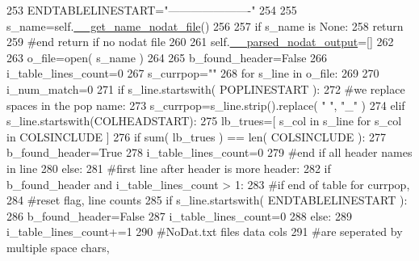 \begin{DoxyCode}
253         ENDTABLELINESTART=\textcolor{stringliteral}{"----------------------"}  
254 
255         s\_name=self.\hyperlink{classnegui_1_1pgoutputneestimator_1_1PGOutputNeEstimator_ab1fea13d322982ecc8b5fbe42741de50}{\_\_get\_name\_nodat\_file}()
256 
257         \textcolor{keywordflow}{if} s\_name \textcolor{keywordflow}{is} \textcolor{keywordtype}{None}:
258             \textcolor{keywordflow}{return}
259         \textcolor{comment}{#end return if no nodat file}
260 
261         self.\hyperlink{classnegui_1_1pgoutputneestimator_1_1PGOutputNeEstimator_acd31d6f910fc03d1945e38b6c4fa79c0}{\_\_parsed\_nodat\_output}=[]
262 
263         o\_file=open( s\_name )
264 
265         b\_found\_header=\textcolor{keyword}{False}
266         i\_table\_lines\_count=0
267         s\_currpop=\textcolor{stringliteral}{""}
268         \textcolor{keywordflow}{for} s\_line \textcolor{keywordflow}{in} o\_file:
269 
270             i\_num\_match=0
271             \textcolor{keywordflow}{if} s\_line.startswith( POPLINESTART ):
272                 \textcolor{comment}{#we replace spaces in the pop name:}
273                 s\_currpop=s\_line.strip().replace( \textcolor{stringliteral}{" "}, \textcolor{stringliteral}{"\_"} )
274             \textcolor{keywordflow}{elif} s\_line.startswith(COLHEADSTART):
275                 lb\_trues=[ s\_col \textcolor{keywordflow}{in} s\_line \textcolor{keywordflow}{for} s\_col \textcolor{keywordflow}{in} COLSINCLUDE ]
276                 \textcolor{keywordflow}{if} sum( lb\_trues ) == len( COLSINCLUDE ):
277                     b\_found\_header=\textcolor{keyword}{True}
278                     i\_table\_lines\_count=0
279                 \textcolor{comment}{#end if all header names in line}
280             \textcolor{keywordflow}{else}:
281                 \textcolor{comment}{#first line after header is more header:}
282                 \textcolor{keywordflow}{if} b\_found\_header \textcolor{keywordflow}{and} i\_table\_lines\_count > 1:
283                     \textcolor{comment}{#if end of table for currpop, }
284                     \textcolor{comment}{#reset flag, line counts}
285                     \textcolor{keywordflow}{if} s\_line.startswith( ENDTABLELINESTART ):
286                         b\_found\_header=\textcolor{keyword}{False}
287                         i\_table\_lines\_count=0
288                     \textcolor{keywordflow}{else}:
289                         i\_table\_lines\_count+=1
290                         \textcolor{comment}{#NoDat.txt files data cols}
291                         \textcolor{comment}{#are seperated by multiple space chars,}

\end{DoxyCode}

